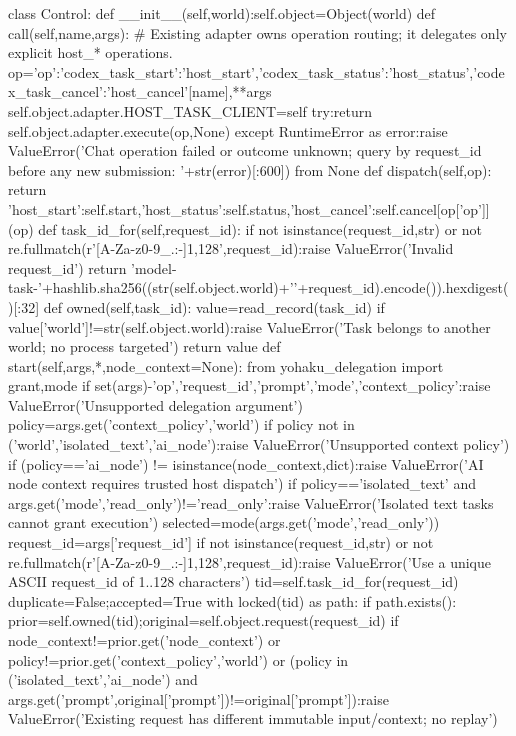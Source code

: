 class Control:
    def __init__(self,world):self.object=Object(world)
    def call(self,name,args):
        # Existing adapter owns operation routing; it delegates only explicit host_* operations.
        op={'op':{'codex_task_start':'host_start','codex_task_status':'host_status','codex_task_cancel':'host_cancel'}[name],**args}
        self.object.adapter.HOST_TASK_CLIENT=self
        try:return self.object.adapter.execute(op,None)
        except RuntimeError as error:raise ValueError('Chat operation failed or outcome unknown; query by request_id before any new submission: '+str(error)[:600]) from None
    def dispatch(self,op):
        return {'host_start':self.start,'host_status':self.status,'host_cancel':self.cancel}[op['op']](op)
    def task_id_for(self,request_id):
        if not isinstance(request_id,str) or not re.fullmatch(r'[A-Za-z0-9_.:-]{1,128}',request_id):raise ValueError('Invalid request_id')
        return 'model-task-'+hashlib.sha256((str(self.object.world)+'\0'+request_id).encode()).hexdigest()[:32]
    def owned(self,task_id):
        value=read_record(task_id)
        if value['world']!=str(self.object.world):raise ValueError('Task belongs to another world; no process targeted')
        return value
    def start(self,args,*,node_context=None):
        from yohaku_delegation import grant,mode
        if set(args)-{'op','request_id','prompt','mode','context_policy'}:raise ValueError('Unsupported delegation argument')
        policy=args.get('context_policy','world')
        if policy not in ('world','isolated_text','ai_node'):raise ValueError('Unsupported context policy')
        if (policy=='ai_node') != isinstance(node_context,dict):raise ValueError('AI node context requires trusted host dispatch')
        if policy=='isolated_text' and args.get('mode','read_only')!='read_only':raise ValueError('Isolated text tasks cannot grant execution')
        selected=mode(args.get('mode','read_only'))
        request_id=args['request_id']
        if not isinstance(request_id,str) or not re.fullmatch(r'[A-Za-z0-9_.:-]{1,128}',request_id):raise ValueError('Use a unique ASCII request_id of 1..128 characters')
        tid=self.task_id_for(request_id)
        duplicate=False;accepted=True
        with locked(tid) as path:
            if path.exists():
                prior=self.owned(tid);original=self.object.request(request_id)
                if node_context!=prior.get('node_context') or policy!=prior.get('context_policy','world') or (policy in ('isolated_text','ai_node') and args.get('prompt',original['prompt'])!=original['prompt']):raise ValueError('Existing request has different immutable input/context; no replay')
